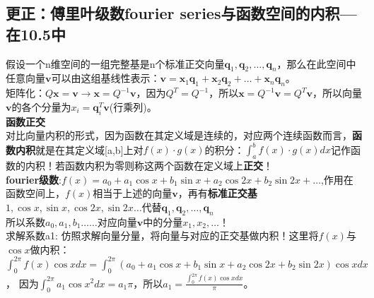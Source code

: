 \documentclass[UTF8]{article}
\begin{document}
    \subsection{更正：傅里叶级数fourier series与函数空间的内积---在10.5中}
    假设一个n维空间的一组完整基是n个标准正交向量$\bm{q}_{1}, \bm{q}_{2}, \dots ,\bm{q}_{n}$，那么在此空间中任意向量$\bm{v}$可以由这组基线性表示：$\bm{v}=\bm{x}_{1} \bm{q}_{1}+\bm{x}_{2} \bm{q}_{2}+\ldots +\bm{x}_{n} \bm{q}_{n}$。\\
    矩阵化：$Q \bm{x}=\bm{v} \rightarrow \bm{x}=Q^{-1} \bm{v}$，因为$Q^{T}=Q^{-1}$，所以$\bm{x}=Q^{-1} \bm{v}=Q^{T} \bm{v}$，所以向量$\bm{v}$的各个分量为$x_{i} = \bm{q}_{i}^{T} \bm{v}$(行乘列)。\\
    \textbf{函数正交}\\
    对比向量内积的形式，因为函数在其定义域是连续的，对应两个连续函数而言，\textbf{函数内积}就是在其定义域[a,b]上对$f(x) \cdot g(x)$的积分：$ \int_{a}^{b}f(x) \cdot g(x)dx$记作函数的内积！若函数内积为零则称这两个函数在定义域上\textbf{正交}！\\
    \textbf{fourier级数}:$f(x)=a_{0}+a_{1} \cos x+b_{1} \sin x+a_{2} \cos 2 x+b_{2} \sin 2 x+\ldots$,作用在函数空间上，$f(x)$相当于上述的向量$\bm{v}$，再有\textbf{标准正交基}$1, \cos x, \sin x, \cos 2 x, \sin 2 x \ldots$代替$\boldsymbol{q}_{1}, \boldsymbol{q}_{2}, \dots, \boldsymbol{q}_{n}$
    \\
    所以系数$a_{0}, a_{1}, b_{1} \dots \dots$对应向量$\bm{v}$中的分量$x_{1}, x_{2}, \dots$！\\
    求解系数a1: 仿照求解向量分量，将向量与对应的正交基做内积！这里将$f(x)$与$\cos x$做内积：$\int_{0}^{2 \pi} f(x) \cos x d x=\int_{0}^{2 \pi}\left(a_{0}+a_{1} \cos x+b_{1} \sin x+a_{2} \cos 2 x+b_{2} \sin 2 x\right) \cos x d x$， 因为$\int_{0}^{2 \pi} a_{1} \cos x^{2} d x=a_{1} \pi$，所以$a_{1}=\frac{\int_{0}^{2 \pi} f(x) \cos x d x}{\pi}$。
\end{document}
